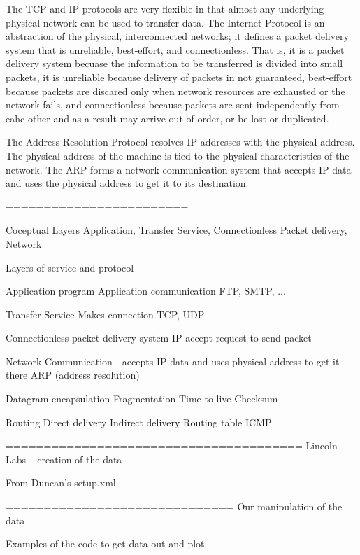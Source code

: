 The TCP and IP protocols are very flexible in that almost any 
underlying physical network can be used to transfer data.
The Internet Protocol is an abstraction of the physical, interconnected
networks; it defines a packet delivery system that is
unreliable, best-effort, and connectionless.
That is, it is a packet delivery system becuase the information
to be transferred is divided into small packets, it is
unreliable because delivery of packets in not guaranteed,
best-effort because packets are discared only when network
resources are exhausted or the network fails, and 
connectionless because packets are sent independently
from eahc other and as a result may arrive out of order,
or be lost or duplicated.


The Address Resolution Protocol resolves IP addresses with the physical
address.  The physical address of the machine is tied to the physical
characteristics of the network.  
The ARP forms a network communication system that accepts IP data
and uses the physical address to get it to its destination.



========================

Coceptual Layers
Application, Transfer Service, Connectionless Packet delivery,
Network

Layers of service and protocol

Application program
Application communication
FTP, SMTP, ...

Transfer Service Makes connection
TCP, UDP

Connectionless packet delivery system
IP accept request to send packet

Network Communication - accepts IP data and 
uses physical address to get it there
ARP (address resolution)

Datagram
encapsulation
Fragmentation
Time to live 
Checksum

Routing
Direct delivery
Indirect delivery
Routing table
ICMP

=======================================
Lincoln Labs -- creation of the data

From Duncan's setup.xml


==============================
Our manipulation of the data 

Examples of the code to get data out and plot.
